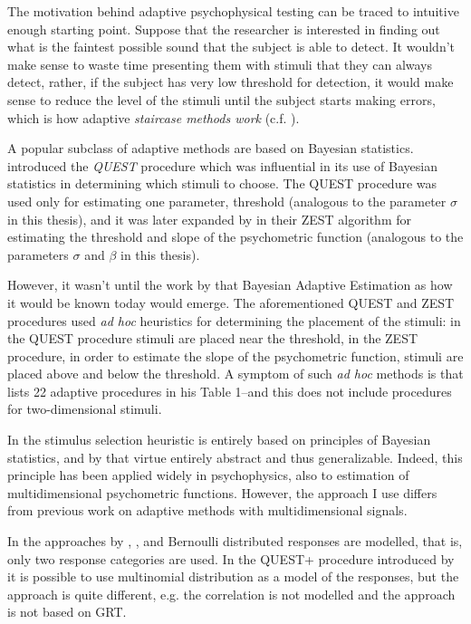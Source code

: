 \documentclass{article}\usepackage{knitr}
\begin{document}
The motivation behind adaptive psychophysical testing can be traced to intuitive enough starting point. Suppose that the researcher is interested in finding out what is the faintest possible sound that the subject is able to detect. It wouldn't make sense to waste time presenting them with stimuli that they can always detect, rather, if the subject has very low threshold for detection, it would make sense to reduce the level of the stimuli until the subject starts making errors, which is how adaptive \textit{staircase methods work} (c.f. \citet[Chapter 5]{kingdomprins2010}).

A popular subclass of adaptive methods are based on Bayesian statistics. \cite{watson1983} introduced the \textit{QUEST} procedure which was influential in its use of Bayesian statistics in determining which stimuli to choose. The QUEST procedure was used only for estimating one parameter, threshold (analogous to the parameter $\sigma$ in this thesis),  and it was later expanded by \citet{king_smith1997} in their ZEST algorithm for estimating the threshold and slope of the psychometric function (analogous to the parameters $\sigma$ and $\beta$ in this thesis). 

However, it wasn't until the work by \citet{kontsevichtyler1999} that Bayesian Adaptive Estimation as how it would be known today would emerge. The aforementioned QUEST and ZEST procedures used \textit{ad hoc} heuristics for determining the placement of the stimuli: in the QUEST procedure stimuli are placed near the threshold, in the ZEST procedure, in order to estimate the slope of the psychometric function, stimuli are placed above and below the threshold. A symptom of such \textit{ad hoc} methods is that \citet{treutwein1995} lists 22 adaptive procedures in his Table 1--and this does not include procedures for two-dimensional stimuli.

In \citet{kontsevichtyler1999} the stimulus selection heuristic is entirely based on principles of Bayesian statistics, and by that virtue entirely abstract and thus generalizable. Indeed, this principle has been applied widely in psychophysics, also to estimation of multidimensional psychometric functions. However, the approach I use differs from previous work on adaptive methods with multidimensional signals. 

In the approaches by \citet{dimattina2015}, \citet{lesmes2006}, \citet{shen2013, shen2014} and \citet{kujalalukka2006} Bernoulli distributed responses are modelled, that is, only two response categories are used. In the QUEST+ procedure introduced by \citet{watson2017} it is possible to use multinomial distribution as a model of the responses, but the approach is quite different, e.g. the correlation is not modelled and the approach is not based on GRT.
\end{document}
